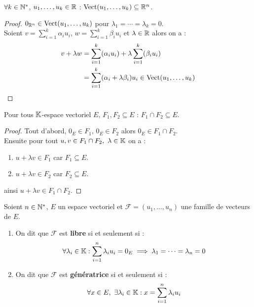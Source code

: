 \begin{proposition}
	$\forall k \in \mathbb{N}^*$, $u_1, \ldots, u_k \in \mathbb{R}$ : 
	$\operatorname{Vect}(u_1, \ldots, u_k) \subseteq \mathbb{R}^n$.
\end{proposition}

\begin{proof}
	$0_{\mathbb{R}^n} \in \operatorname{Vect}(u_1, \ldots, u_k)$ pour $\lambda_1 = \cdots = \lambda_k = 0$.
	\\
	Soient $v = \sum_{i=1}^{k} \alpha_i u_i$, $w = \sum_{i=1}^{k} \beta_i u_i$ et $\lambda \in \mathbb{R}$ alors on a :
	\begin{align*}
		v + \lambda w &= \sum_{i=1}^{k} (\alpha_i u_i) + \lambda \sum_{i=1}^{k} (\beta_i u_i) \\
		&= \sum_{i=1}^{k} (\alpha_i + \lambda \beta_i) u_i \in \operatorname{Vect}(u_1, \ldots, u_k)
	\end{align*}
\end{proof}

\begin{proposition}
	Pour tous $\mathbb{K}$-espace vectoriel $E$, $F_1, F_2 \subseteq E$ : 
	$F_1 \cap F_2 \subseteq E$.
\end{proposition}

\begin{proof}
	Tout d'abord, $0_E \in F_1$, $0_E \in F_2$ alors $0_E \in F_1 \cap F_2$.
	\\
	Ensuite pour tout $u, v \in F_1 \cap F_2,\ \lambda \in \K$ on a :
	\begin{enumerate}
		\item $u + \lambda v \in F_1$ car $F_1 \subseteq E$. 
		\item $u + \lambda v \in F_2$ car $F_2 \subseteq E$.
	\end{enumerate}
	ainsi $u + \lambda v \in F_1 \cap F_2$.
\end{proof}

\begin{definition}
	Soient $n \in \mathbb{N}^*$, $E$ un espace vectoriel et $\mathcal{F} = (u_1, \ldots, u_n)$ une famille de vecteurs de $E$.
	\begin{enumerate}
		\item On dit que $\mathcal{F}$ est \textbf{libre} si et seulement si :
		\begin{align*}
			\forall \lambda_i \in \mathbb{K} : \sum_{i = 1}^n \lambda_i u_i = 0_E \implies \lambda_1 = \cdots = \lambda_n = 0
		\end{align*}
		\item On dit que $\mathcal{F}$ est \textbf{génératrice} si et seulement si :
		\begin{align*}
			\forall x \in E,\ \exists \lambda_i \in \mathbb{K} : x = \sum_{i = 1}^n \lambda_i u_i 
		\end{align*}
	\end{enumerate}
\end{definition}


